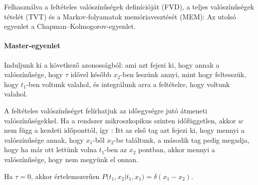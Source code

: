    Felhasználva a feltételes valószínűségek definícióját (FVD), a teljes valószínűségek tételét (TVT) és a Markov-folyamatok memóriavesztését (MEM):
   Az utolsó egyenlet a Chapman--Kolmogorov-egyenlet. 
   
   \paragraph{Master-egyenlet}
    
    Induljunk ki a következő azonosságból:
    ami azt fejezi ki, hogy annak a valószínűsége, hogy $\tau$ idővel később $x_2$-ben leszünk annyi, mint hogy feltesszük, hogy $t_1$-ben voltunk valahol, és integrálunk arra a feltételre, hogy voltunk valahol. 
    
    A feltételes valószínűséget felírhatjuk az időegységre jutó átmeneti valószínűségekkel. Ha a rendszer mikroszkopikus szinten időfüggetlen, akkor $w$ nem függ a kezdeti időponttól, így :
    Itt az első tag azt fejezi ki, hogy mennyi a valószínűsége annak, hogy $x_1$-ből $x_2$-be találtunk, a második tag pedig megadja, hogy ha már ott lettünk volna $t_1$-ben az $x_2$ pontban, akkor mennyi a valószínűsége, hogy nem megyünk el onnan.
    
    Ha $\tau=0$, akkor értelemszerűen $P\big(t_1,x_2|t_1,x_1\big)=\delta(x_1-x_2)$.
    
